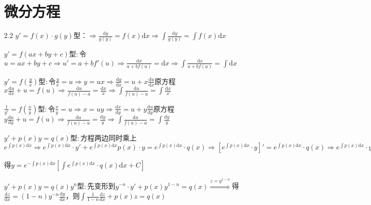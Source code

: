 \section{微分方程}

\begin{spacing}{2.2}
    {\color{red} $ y' = f(x) \cdot g(y)$}型：$\displaystyle \Rightarrow \frac{\mathrm{d}y}{g(y)} = f(x)\mathrm{d}x \Rightarrow \int{\frac{\mathrm{d}y}{g(y)}} = \int{f(x)}\mathrm{d}x $

    {\color{red} $y' = f(ax + by + c)$}型$\colon$令$\displaystyle u = ax +by + c \Rightarrow u' = a + bf'(u) \Rightarrow \frac{\mathrm{d}x}{a + bf(u)} = \mathrm{d}x \Rightarrow \int{\frac{\mathrm{d}x}{a + bf(u)}} = \int\mathrm{d}x$

    {\color{red} $y' = f(\frac{y}{x})$}型$\colon$令$\frac{y}{x} = u \Rightarrow y = ux \Rightarrow \frac{\mathrm{d}y}{\mathrm{d}x} = u + x\frac{\mathrm{d}u}{\mathrm{d}x}$原方程$\displaystyle x\frac{\mathrm{d}u}{\mathrm{d}x} + u = f(u) \Rightarrow \frac{\mathrm{d}u}{f(u)-u} = \frac{\mathrm{d}x}{x} \Rightarrow \int{\frac{\mathrm{d}u}{f(u)-u}} = \int{\frac{\mathrm{d}x}{x}}$

    {\color{red} $\frac{1}{y'} = f(\frac{x}{y})$}型$\colon$令$\frac{x}{y} = u \Rightarrow x = uy \Rightarrow \frac{\mathrm{d}x}{\mathrm{d}y} = u + y\frac{\mathrm{d}u}{\mathrm{d}y}$原方程$\displaystyle y\frac{\mathrm{d}u}{\mathrm{d}y} + u = f(u) \Rightarrow \frac{\mathrm{d}u}{f(u)-u} = \frac{\mathrm{d}y}{y} \Rightarrow \int{\frac{\mathrm{d}u}{f(u)-u}} = \int{\frac{\mathrm{d}y}{y}}$

    {\color{red} $y' + p(x)y = q(x)$}型$\colon$方程两边同时乘上$\displaystyle e^{\int{p(x)\mathrm{d}x}} \Rightarrow e^{\int{p(x)\mathrm{d}x}} \cdot y' + e^{\int{p(x)\mathrm{d}x}}p(x) \cdot y = e^{\int{p(x)\mathrm{d}x}} \cdot q(x) \Rightarrow \left[e^{\int{p(x)\mathrm{d}x}} \cdot y\right]' = e^{\int{p(x)\mathrm{d}x}} \cdot q(x) \Rightarrow e^{\int{p(x)\mathrm{d}x}} \cdot y = \int{e^{\int{p(x)\mathrm{d}x}} \cdot q(x)}\mathrm{d}x + C$

    \noindent 得$\displaystyle y = e^{-\int{p(x)\mathrm{d}x}}\left[\int{e^{\int{p(x)\mathrm{d}x}} \cdot q(x)\mathrm{d}x} + C\right]$

    {\color{red} $y' + p(x)y = q(x)y^n$}型$\colon$先变形到$y^{-n} \cdot y' + p(x)y^{1-n} = q(x) \stackrel{z = y^{1-n}}{\Longrightarrow}$得$\frac{\mathrm{d}z}{\mathrm{d}x} = (1 - n)y^{-n}\frac{\mathrm{d}y}{\mathrm{d}x}$，则$\displaystyle \int \frac{1}{1 - n}\frac{\mathrm{d}z}{\mathrm{d}x} + p(x)z = q(x)$


\end{spacing}
